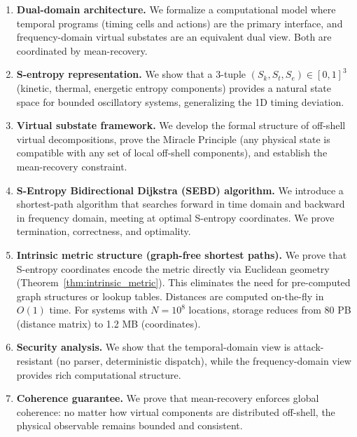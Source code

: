 \documentclass[twocolumn,11pt,a4paper]{article}
\newcommand{\Sk}{S_k}
\newcommand{\St}{S_t}
\newcommand{\Se}{S_e}
\begin{document}
\begin{enumerate}[leftmargin=1.5em,topsep=2pt,itemsep=1pt]
  \item \textbf{Dual-domain architecture.} We formalize a computational model where temporal programs (timing cells and actions) are the primary interface, and frequency-domain virtual substates are an equivalent dual view. Both are coordinated by mean-recovery.

  \item \textbf{S-entropy representation.} We show that a 3-tuple $(\Sk, \St, \Se) \in [0,1]^3$ (kinetic, thermal, energetic entropy components) provides a natural state space for bounded oscillatory systems, generalizing the 1D timing deviation.

  \item \textbf{Virtual substate framework.} We develop the formal structure of off-shell virtual decompositions, prove the Miracle Principle (any physical state is compatible with any set of local off-shell components), and establish the mean-recovery constraint.

  \item \textbf{S-Entropy Bidirectional Dijkstra (SEBD) algorithm.} We introduce a shortest-path algorithm that searches forward in time domain and backward in frequency domain, meeting at optimal S-entropy coordinates. We prove termination, correctness, and optimality.

  \item \textbf{Intrinsic metric structure (graph-free shortest paths).} We prove that S-entropy coordinates encode the metric directly via Euclidean geometry (Theorem~\ref{thm:intrinsic_metric}). This eliminates the need for pre-computed graph structures or lookup tables. Distances are computed on-the-fly in $O(1)$ time. For systems with $N=10^8$ locations, storage reduces from 80 PB (distance matrix) to 1.2 MB (coordinates).

  \item \textbf{Security analysis.} We show that the temporal-domain view is attack-resistant (no parser, deterministic dispatch), while the frequency-domain view provides rich computational structure.

  \item \textbf{Coherence guarantee.} We prove that mean-recovery enforces global coherence: no matter how virtual components are distributed off-shell, the physical observable remains bounded and consistent.
\end{enumerate}
\end{document}
